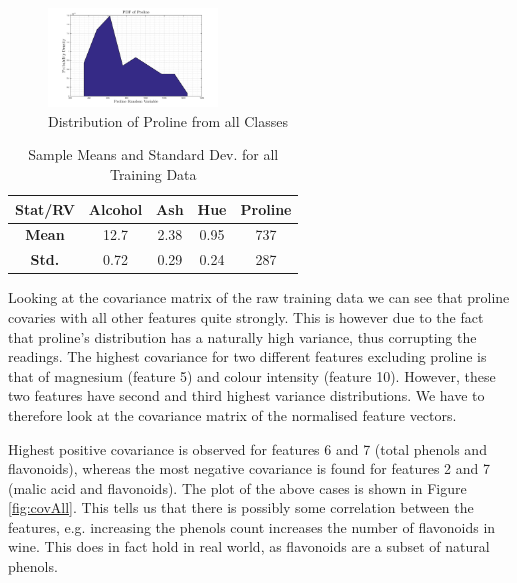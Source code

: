 \documentclass[10pt,twocolumn,letterpaper]{article}
\begin{document}
\begin{figure}[H]
\centering
\includegraphics[width=0.4\textwidth]{../results/Q1_ProlineDist}
\caption{Distribution of Proline from all Classes \label{fig:DistProline}}
\end{figure}

\begin{table}[H]
\caption{Sample Means and Standard Dev. for all Training Data \label{tab:statAll}}
\small
\begin{center}
\begin{tabular}{|c| c c c c|}
\hline
\bf Stat/RV & Alcohol & Ash & Hue & Proline \\ [0.5ex]
\hline
\bf Mean & 12.7 & 2.38 & 0.95 & 737 \\ [0.5ex]
\hline
\bf Std. & 0.72 & 0.29 & 0.24 & 287 \\ [0.5ex]
\hline
\end{tabular}
\end{center}
\end{table}

\vspace{-5mm}

Looking at the covariance matrix of the raw training data we can see that proline covaries with all other features quite strongly. This is however due to the fact that proline's distribution has a naturally high variance, thus corrupting the readings. The highest covariance for two different features excluding proline is that of magnesium (feature 5) and colour intensity (feature 10). However, these two features have second and third highest variance distributions. We have to therefore look at the covariance matrix of the normalised feature vectors.

Highest positive covariance is observed for features 6 and 7 (total phenols and flavonoids), whereas the most negative covariance is found for features 2 and 7 (malic acid and flavonoids). The plot of the above cases is shown in Figure \ref{fig:covAll}. This tells us that there is possibly some correlation between the features, e.g. increasing the phenols count increases the number of flavonoids in wine. This does in fact hold in real world, as flavonoids are a subset of natural phenols.
\end{document}
